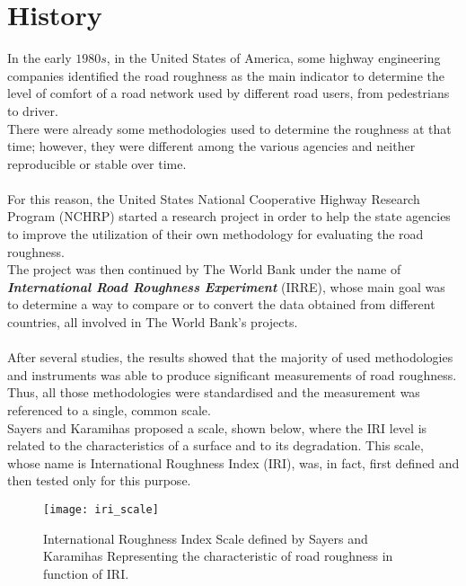 \documentclass[tesi]{subfiles}
\begin{document}
\section{History}\label{sc:IRI_History}
\noindent In the early $1980s$, in the United States of America, some highway engineering companies identified the road roughness as the main indicator to determine the level of comfort of a road network used by different road users, from pedestrians to driver. \\There were already some methodologies used to determine the roughness at that time; however, they were different among the various agencies and neither reproducible or stable over time.\\\\
For this reason, the United States National Cooperative Highway Research Program (NCHRP) started a research project in order to help the state agencies to improve the utilization of their own methodology for evaluating the road roughness\cite{gillespie1980calibration}.\\The project was then continued by The World Bank\cite{sayers1986guidelines} under the name of \textbf{\textit{International Road Roughness Experiment}} (IRRE)\cite{sayers1986internationalscale}, whose main goal was to determine a way to compare or to convert the data obtained from different countries, all involved in The World Bank's projects.\\\\
After several studies, the results showed that the majority of used methodologies and instruments was able to produce significant measurements\cite{sayers1986international} of road roughness. Thus, all those methodologies were standardised and the measurement was referenced to a single, common scale.\\
Sayers and Karamihas \cite{little_book} proposed a scale, shown below, where the IRI level is related to the characteristics of a surface and to its degradation. This scale, whose name is International Roughness Index (IRI), was, in fact, first defined and then tested only for this purpose.
\\
\begin{figure}[ht]
\texttt{[image: iri\_scale]}
\caption{International Roughness Index Scale defined by Sayers and Karamihas \cite{little_book}
Representing the characteristic of road roughness in function of IRI.}
\label{fig:International Roughness Index Scale}
\end{figure}
\clearpage
\end{document}
